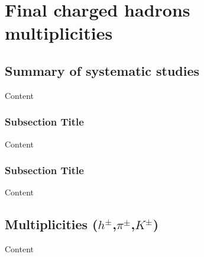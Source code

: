 
\chapter{Final charged hadrons multiplicities} %

\label{ch:mult} %


\section{Summary of systematic studies}

Content


\subsection{Subsection Title}

Content


\subsection{Subsection Title}

Content


\section{Multiplicities ($h^{\pm}$,$\pi^{\pm}$,$K^{\pm}$)}

Content
